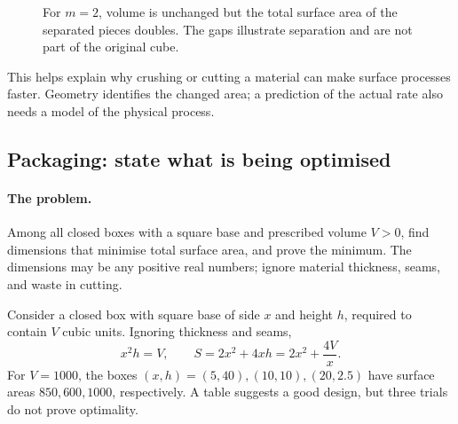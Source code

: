 \begin{figure}[htbp]\centering
{}
\caption{For $m=2$, volume is unchanged but the total surface area of the separated pieces doubles. The gaps illustrate separation and are not part of the original cube.}
\end{figure}

This helps explain why crushing or cutting a material can make surface
processes faster. Geometry identifies the changed area; a prediction of
the actual rate also needs a model of the physical process.

\subsection{Packaging: state what is being optimised}
\paragraph{The problem.}
Among all closed boxes with a square base and prescribed volume $V>0$,
find dimensions that minimise total surface area, and prove the minimum.
The dimensions may be any positive real numbers; ignore material thickness,
seams, and waste in cutting.

Consider a closed box with square base of side $x$ and height $h$,
required to contain $V$ cubic units. Ignoring thickness and seams,
\[
x^2h=V,\qquad S=2x^2+4xh=2x^2+\frac{4V}{x}.
\]
For $V=1000$, the boxes $(x,h)=(5,40),(10,10),(20,2.5)$ have surface
areas $850,600,1000$, respectively. A table suggests a good design, but
three trials do not prove optimality.

